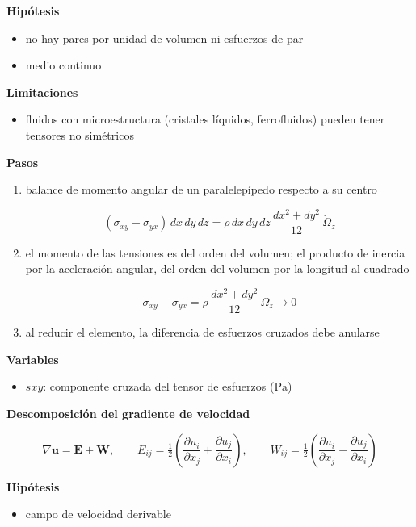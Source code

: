 \documentclass[10pt,openany]{book}
\begin{document}
\begin{tcolorbox}[title={Desarrollos del modelo}, studiumdef, breakable]
\noindent\textbf{Hipótesis}
\begin{itemize}
\item no hay pares por unidad de volumen ni esfuerzos de par
\item medio continuo
\end{itemize}

\noindent\textbf{Limitaciones}
\begin{itemize}
\item fluidos con microestructura (cristales líquidos, ferrofluidos) pueden tener tensores no simétricos
\end{itemize}

\noindent\textbf{Pasos}
\begin{enumerate}
\item
balance de momento angular de un paralelepípedo respecto a su centro

\[
(\sigma_{xy} - \sigma_{yx})\,dx\,dy\,dz = \rho\,dx\,dy\,dz\,\frac{dx^{2} + dy^{2}}{12}\,\dot\Omega_z
\]
\item
el momento de las tensiones es del orden del volumen; el producto de inercia por la aceleración angular, del orden del volumen por la longitud al cuadrado

\[
\sigma_{xy} - \sigma_{yx} = \rho\,\frac{dx^{2} + dy^{2}}{12}\,\dot\Omega_z \to 0
\]
\item
al reducir el elemento, la diferencia de esfuerzos cruzados debe anularse
\end{enumerate}

\noindent\textbf{Variables}
\begin{itemize}
\item $sxy$: componente cruzada del tensor de esfuerzos ($\mathrm{Pa}$)
\end{itemize}



\noindent\textbf{Descomposición del gradiente de velocidad}

\begin{equation}
\nabla\mathbf{u} = \mathbf{E} + \mathbf{W},\qquad E_{ij} = \tfrac12\left(\frac{\partial u_i}{\partial x_j} + \frac{\partial u_j}{\partial x_i}\right),\qquad W_{ij} = \tfrac12\left(\frac{\partial u_i}{\partial x_j} - \frac{\partial u_j}{\partial x_i}\right)
\label{eq:c13-gradiente}
\end{equation}

\noindent\textbf{Hipótesis}
\begin{itemize}
\item campo de velocidad derivable
\end{itemize}


\end{tcolorbox}
\end{document}
